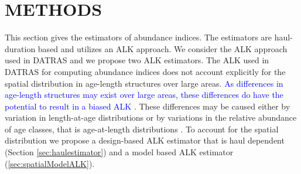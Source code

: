 \documentclass[a4paper 12pt]{article}
\numberwithin{equation}{section}
\newcommand{\nat}[1]{\textcolor{blue}{#1}}
\begin{document}
\section{\large METHODS}
\label{sec:methods}
This section gives the estimators of abundance indices. The estimators are haul-duration based and utilizes an ALK approach. We consider the ALK approach used in DATRAS and we propose two ALK estimators. The ALK used in DATRAS for computing abundance indices does not account explicitly for the spatial distribution in age-length structures over large areas. \nat{As differences in age-length structures may exist over large areas, these differences do have the potential to result in a biased ALK \citep{gerritsen2006simple,kimura1977statistical}}. These differences may be caused either by variation in length-at-age distributions or by variations in the relative abundance of age classes, that is age-at-length distributions \citep{gerritsen2006simple}.  To account for the spatial distribution we propose a design-based ALK estimator that is haul dependent (Section \ref{sec:haulestimator}) and a model based ALK estimator (\ref{sec:spatialModelALK}).
\end{document}
